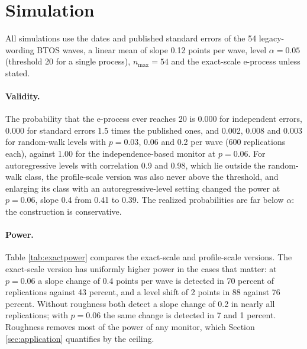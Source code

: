 \documentclass[11pt]{article}
\theoremstyle{plain}
\theoremstyle{definition}
\begin{document}
\section{Simulation}
\label{sec:simulation}

All simulations use the dates and published standard errors of the 54 legacy-wording BTOS waves, a linear mean of slope 0.12 points per wave, level $\alpha = 0.05$ (threshold 20 for a single process), $n_{\max}=54$ and the exact-scale e-process unless stated.

\paragraph{Validity.} The probability that the e-process ever reaches 20 is 0.000 for independent errors, 0.000 for standard errors 1.5 times the published ones, and 0.002, 0.008 and 0.003 for random-walk levels with $p=0.03$, 0.06 and 0.2 per wave (600 replications each), against 1.00 for the independence-based monitor at $p=0.06$. For autoregressive levels with correlation 0.9 and 0.98, which lie outside the random-walk class, the profile-scale version was also never above the threshold, and enlarging its class with an autoregressive-level setting changed the power at $p=0.06$, slope 0.4 from 0.41 to 0.39. The realized probabilities are far below $\alpha$: the construction is conservative.

\paragraph{Power.} Table \ref{tab:exactpower} compares the exact-scale and profile-scale versions. The exact-scale version has uniformly higher power in the cases that matter: at $p=0.06$ a slope change of 0.4 points per wave is detected in 70 percent of replications against 43 percent, and a level shift of 2 points in 88 against 76 percent. Without roughness both detect a slope change of 0.2 in nearly all replications; with $p=0.06$ the same change is detected in 7 and 1 percent. Roughness removes most of the power of any monitor, which Section \ref{sec:application} quantifies by the ceiling.

\begin{table}[t]
\centering\small
\caption{Probability of declaring by the last wave when the slope changes by $\delta$ points per wave, or the level shifts by $\delta$ points, at wave 25 of 54, for roughness $p$ (variance of the level disturbance per wave; the published sampling variance is about 0.02). 300 replications.}
\label{tab:exactpower}

\end{table}
\end{document}
